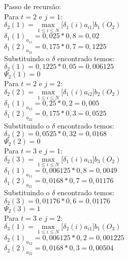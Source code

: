 \begin{multicols}{2}
Passo de recursão:\\

Para $t=2$ e $j = 1$:\\
$\displaystyle \delta_2 (1) = \max\limits_{1 \leq i \leq N} \Big[\delta_{1}(i) a_{i1} \Big]b_1 (O_2)$\\
$\delta_1(1)_{a_{11}} = 0,025 * 0,8 = 0,02$\\
$\delta_1(2)_{a_{21}} = 0,175 * 0,7 = 0,1225$ \\


Substituindo o $\delta$ encontrado temos:\\
$\delta_2(1) = 0,1225 * 0,05 = 0,006125$\\
$\Psi_2(1) = 0$\\

Para $t=2$ e $j = 2$:\\
$\displaystyle \delta_2 (2) = \max\limits_{1 \leq i \leq N} \Big[\delta_{1}(i) a_{i2} \Big]b_2 (O_2)$\\
$\delta_1(1)_{a_{12}} = 0,25 * 0,2 = 0,005$\\
$\delta_1(2)_{a_{22}} = 0,175 * 0,3 = 0,0525$\\ 


 
 Substituindo o $\delta$ encontrado temos:\\
$\delta_2(2) = 0,0525 * 0,32 = 0,0168$\\ 
$\Psi_2(2) = 0$\\

Para $t=3$ e $j = 1$:\\
$\displaystyle \delta_2 (3) = \max\limits_{1 \leq i \leq N} \Big[\delta_{1}(i) a_{i3} \Big]b_3 (O_2)$\\
$\delta_1(1)_{a_{11}} = 0,006125 * 0,8 = 0,0049$\\
$\delta_1(2)_{a_{21}} = 0,0168 * 0,7 = 0,01176$\\ 

 
 Substituindo o $\delta$ encontrado temos:\\
$\delta_2(3) = 0,01176 * 0,6 = 0,01176$\\ 
$\Psi_2(3) = 1$\\

Para $t=3$ e $j = 2$:\\
$\displaystyle \delta_3 (1) = \max\limits_{1 \leq i \leq N} \Big[\delta_{2}(i) a_{i1} \Big]b_1 (O_3)$\\
$\delta_2(1)_{a_{12}} = 0,006125 * 0,2 = 0,001225$\\
$\delta_2(2)_{a_{22}} = 0,0168 * 0,3 = 0,00504$\\ 



\end{multicols}

